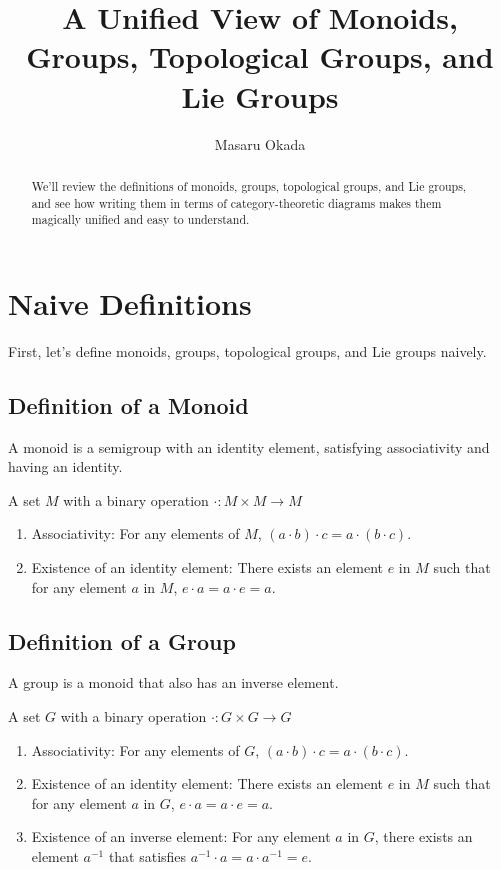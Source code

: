 \documentclass[uplatex,a4j,12pt,dvipdfmx]{jsarticle}
\title{
\hspace{3em} A Unified View of Monoids, \newline Groups, Topological Groups, and Lie Groups
}
\author{
Masaru Okada
}
\begin{document}
\maketitle


\begin{abstract}
	We'll review the definitions of monoids, groups, topological groups, and Lie groups, and see how writing them in terms of category-theoretic diagrams makes them magically unified and easy to understand.
\end{abstract}

\section{Naive Definitions}

First, let's define monoids, groups, topological groups, and Lie groups naively.

\subsection{Definition of a Monoid}

A monoid is a semigroup with an identity element, satisfying associativity and having an identity.

A set $M$ with a binary operation $\cdot : M \times M \to M$

\begin{enumerate}
	\item Associativity: For any elements of $M$, $(a \cdot b) \cdot c = a \cdot (b \cdot c)$.
	\item Existence of an identity element: There exists an element $e$ in $M$ such that for any element $a$ in $M$, $e \cdot a = a \cdot e = a$.
\end{enumerate}

\subsection{Definition of a Group}

A group is a monoid that also has an inverse element.

A set $G$ with a binary operation $\cdot : G \times G \to G$

\begin{enumerate}
	\item Associativity: For any elements of $G$, $(a \cdot b) \cdot c = a \cdot (b \cdot c)$.
	\item Existence of an identity element: There exists an element $e$ in $M$ such that for any element $a$ in $G$, $e \cdot a = a \cdot e = a$.
	\item Existence of an inverse element: For any element $a$ in $G$, there exists an element $a^{-1}$ that satisfies $a^{-1} \cdot a = a \cdot a^{-1} = e$.
\end{enumerate}
\end{document}
